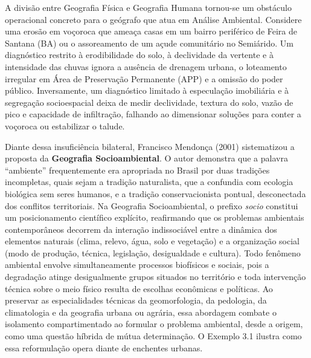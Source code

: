 A divisão entre Geografia Física e Geografia Humana tornou-se um obstáculo operacional concreto para o geógrafo que atua em Análise Ambiental. Considere uma erosão em voçoroca que ameaça casas em um bairro periférico de Feira de Santana (BA) ou o assoreamento de um açude comunitário no Semiárido. Um diagnóstico restrito à erodibilidade do solo, à declividade da vertente e à intensidade das chuvas ignora a ausência de drenagem urbana, o loteamento irregular em Área de Preservação Permanente (APP) e a omissão do poder público. Inversamente, um diagnóstico limitado à especulação imobiliária e à segregação socioespacial deixa de medir declividade, textura do solo, vazão de pico e capacidade de infiltração, falhando ao dimensionar soluções para conter a voçoroca ou estabilizar o talude.

Diante dessa insuficiência bilateral, Francisco Mendonça (2001) sistematizou a proposta da \textbf{Geografia Socioambiental}. O autor demonstra que a palavra ``ambiente'' frequentemente era apropriada no Brasil por duas tradições incompletas, quais sejam a tradição naturalista, que a confundia com ecologia biológica sem seres humanos, e a tradição conservacionista pontual, desconectada dos conflitos territoriais. Na Geografia Socioambiental, o prefixo \textit{socio} constitui um posicionamento científico explícito, reafirmando que os problemas ambientais contemporâneos decorrem da interação indissociável entre a dinâmica dos elementos naturais (clima, relevo, água, solo e vegetação) e a organização social (modo de produção, técnica, legislação, desigualdade e cultura). Todo fenômeno ambiental envolve simultaneamente processos biofísicos e sociais, pois a degradação atinge desigualmente grupos situados no território e toda intervenção técnica sobre o meio físico resulta de escolhas econômicas e políticas. Ao preservar as especialidades técnicas da geomorfologia, da pedologia, da climatologia e da geografia urbana ou agrária, essa abordagem combate o isolamento compartimentado ao formular o problema ambiental, desde a origem, como uma questão híbrida de mútua determinação. O Exemplo 3.1 ilustra como essa reformulação opera diante de enchentes urbanas.

